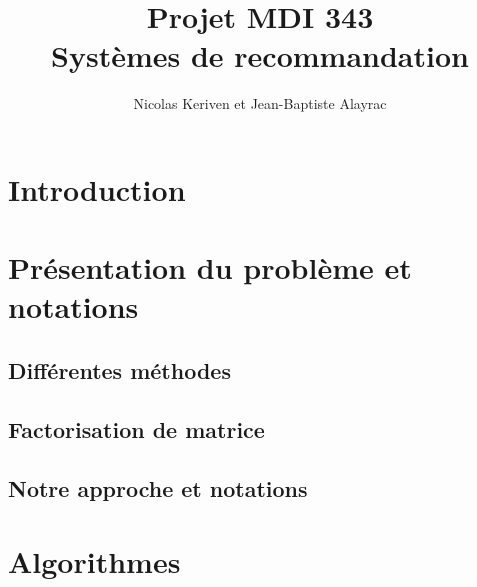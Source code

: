 \documentclass[10pt,a4paper]{article}
\title{Projet MDI 343 \\
Systèmes de recommandation}
\author{Nicolas Keriven et Jean-Baptiste Alayrac}
\begin{document}
\maketitle

\hrulefill
\vspace{2cm}


%
%


\newpage
\tableofcontents

\section*{Introduction}
 

\newpage


\section{Présentation du problème et notations}

\subsection{Différentes méthodes}

\subsection{Factorisation de matrice}

\subsection{Notre approche et notations}

%




\section{Algorithmes}
\end{document}
